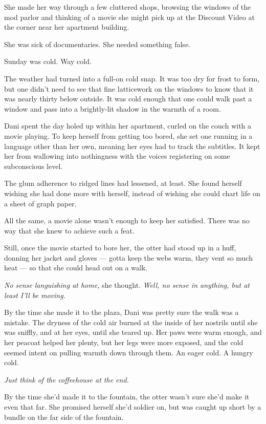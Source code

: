 She made her way through a few cluttered shops, browsing the windows of the mod parlor and thinking of a movie she might pick up at the Discount Video at the corner near her apartment building.

She was sick of documentaries. She needed something false.

\secdiv

Sunday was cold. Way cold.

The weather had turned into a full-on cold snap. It was too dry for frost to form, but one didn't need to see that fine latticework on the windows to know that it was nearly thirty below outside. It was cold enough that one could walk past a window and pass into a brightly-lit shadow in the warmth of a room.

Dani spent the day holed up within her apartment, curled on the couch with a movie playing. To keep herself from getting too bored, she set one running in a language other than her own, meaning her eyes had to track the subtitles. It kept her from wallowing into nothingness with the voices registering on some subconscious level.

The glum adherence to ridged lines had lessened, at least. She found herself wishing she had done more with herself, instead of wishing she could chart life on a sheet of graph paper.

All the same, a movie alone wasn't enough to keep her satisfied. There was no way that she knew to achieve such a feat.

Still, once the movie started to bore her, the otter had stood up in a huff, donning her jacket and gloves --- gotta keep the webs warm, they vent so much heat --- so that she could head out on a walk.

\emph{No sense languishing at home,} she thought. \emph{Well, no sense in anything, but at least I'll be moving.}

By the time she made it to the plaza, Dani was pretty sure the walk was a mistake. The dryness of the cold air burned at the inside of her nostrils until she was sniffly, and at her eyes, until she teared up. Her paws were warm enough, and her peacoat helped her plenty, but her legs were more exposed, and the cold seemed intent on pulling warmth down through them. An eager cold. A hungry cold.

\emph{Just think of the coffeehouse at the end.}

By the time she'd made it to the fountain, the otter wasn't sure she'd make it even that far. She promised herself she'd soldier on, but was caught up short by a bundle on the far side of the fountain.


